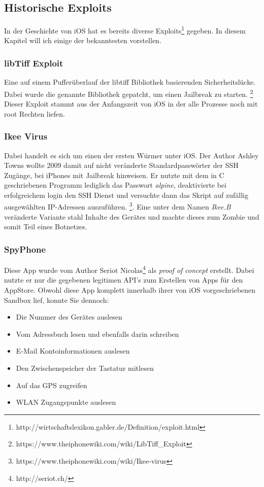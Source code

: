 	\subsection{Historische Exploits}
		In der Geschichte von iOS hat es bereits diverse
		Exploits\footnote{http://wirtschaftslexikon.gabler.de/Definition/exploit.html}
		gegeben. In diesem Kapitel will ich einige der bekanntesten vorstellen.
		\subsubsection{libTiff Exploit} 
			Eine auf einem Pufferüberlauf der libtiff Bibliothek basierenden
			Sicherheitslücke. Dabei wurde die genannte Bibliothek gepatcht, um einen
			Jailbreak zu starten.
			\footnote{https://www.theiphonewiki.com/wiki/LibTiff\_Exploit} Dieser Exploit
			stammt aus der Anfangszeit von iOS in der alle Prozesse noch mit root
			Rechten liefen.
		\subsubsection{Ikee Virus}\label{sec:ikee-exploit}
			Dabei handelt es sich um einen der ersten Würmer unter iOS. Der	Author Ashley Towns
			wollte 2009 damit auf nicht veränderte Standardpasswörter der SSH Zugänge,
			bei iPhones mit Jailbreak hinweisen. Er nutzte mit dem in C geschriebenen
			Programm lediglich das Passwort \textsl{alpine}, deaktivierte bei
			erfolgreichem login den SSH Dienst und versuchte dann das Skript auf
			zufällig ausgewählten IP-Adressen auszuführen.
			\footnote{https://www.theiphonewiki.com/wiki/Ikee-virus}. Eine unter dem
			Namen \textsl{Ikee.B} veränderte Variante stahl Inhalte des Gerätes und
			machte dieses zum Zombie und somit Teil eines Botnetzes.
		\subsubsection{SpyPhone}
			Diese App wurde vom Author Seriot Nicolas\footnote{http://seriot.ch/} als
			\textsl{proof of concept} erstellt. Dabei nutzte er nur die gegebenen
			legitimen API's zum Erstellen von Apps für den AppStore. Obwohl diese App
			komplett innerhalb ihrer von iOS vorgeschriebenen Sandbox lief, konnte
			Sie dennoch:
			\begin{itemize}\itemsep0pt
				\item{Die Nummer des Gerätes auslesen}
				\item{Vom Adressbuch lesen und ebenfalls darin schreiben}
				\item{E-Mail Kontoinformationen auslesen}
				\item{Den Zwischenspeicher der Tastatur mitlesen}
				\item{Auf das GPS zugreifen}
				\item{WLAN Zugangspunkte auslesen}
			\end{itemize}
			
